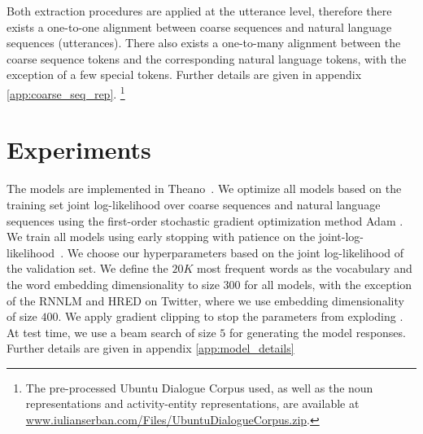 \documentclass{article}
\begin{document}
Both extraction procedures are applied at the utterance level, therefore there exists a one-to-one alignment between coarse sequences and natural language sequences (utterances).
There also exists a one-to-many alignment between the coarse sequence tokens and the corresponding natural language tokens, with the exception of a few special tokens.
Further details are given in appendix \ref{app:coarse_seq_rep}. \footnote{The pre-processed Ubuntu Dialogue Corpus used, as well as the noun representations and activity-entity representations, are available at \url{www.iulianserban.com/Files/UbuntuDialogueCorpus.zip}.}
 
\section{Experiments}
The models are implemented in Theano~\cite{2016arXiv160502688short}.
We optimize all models based on the training set joint log-likelihood over coarse sequences and natural language sequences 
using the first-order stochastic gradient optimization method Adam \cite{kingma2014adampublished}. 
We train all models using early stopping with patience on the joint-log-likelihood~\cite{bengio2012practical}.
We choose our hyperparameters based on the joint log-likelihood of the validation set.
We define the $20K$ most frequent words as the vocabulary and the word embedding dimensionality to size $300$ for all models, with the exception of the RNNLM and HRED on Twitter, where we use embedding dimensionality of size $400$.
We apply gradient clipping to stop the parameters from exploding \cite{pascanu2012difficulty}.
At test time, we use a beam search of size $5$ for generating the model responses.
Further details are given in appendix \ref{app:model_details}
\end{document}
